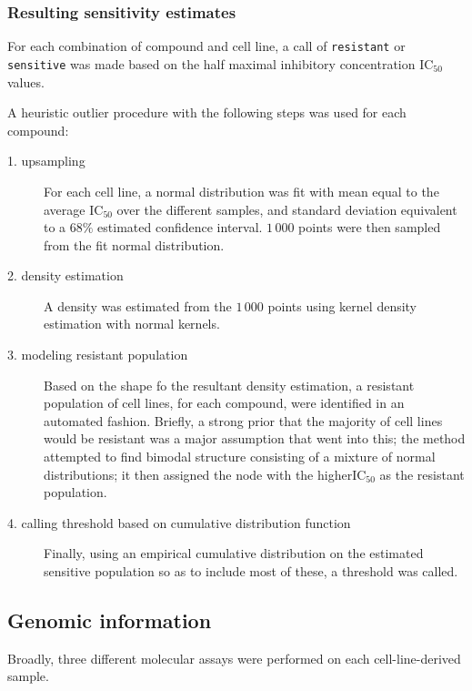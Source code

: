 \subsubsection{Resulting sensitivity estimates}

For each combination of compound and cell line, a call of
\texttt{resistant} or \texttt{sensitive} was made based on the
half maximal inhibitory concentration $\text{IC}_{50}$ values.

A heuristic outlier procedure with the following steps was used for
each compound:

\begin{description}
\item[1. upsampling]
  For each cell line, a normal distribution was fit with mean equal to
  the average $\text{IC}_{50}$ over the different samples, and
  standard deviation equivalent to a $68\%$ estimated confidence
  interval. $1\,000$ points were then sampled from the fit normal
  distribution.

  
\item[2. density estimation]
  A density was estimated from the $1\,000$ points using kernel
  density estimation with normal kernels.

  
\item[3. modeling resistant population]
  Based on the shape fo the resultant density estimation, a resistant population of cell lines, for each compound, were
  identified in an automated fashion. Briefly, a strong prior that the
  majority of cell lines would be resistant was a major assumption
  that went into this; the method attempted to find bimodal structure
  consisting of a mixture of normal distributions; it then assigned
  the node with the higher$\text{IC}_{50}$ as the resistant
  population. 

  
\item[4. calling threshold based on cumulative distribution function]
  Finally, using an empirical cumulative distribution on the estimated
  sensitive population so as to include most of these, a threshold was
  called.   
\end{description}



\subsection{Genomic information}

Broadly, three different molecular assays were performed on each
cell-line-derived sample. 

